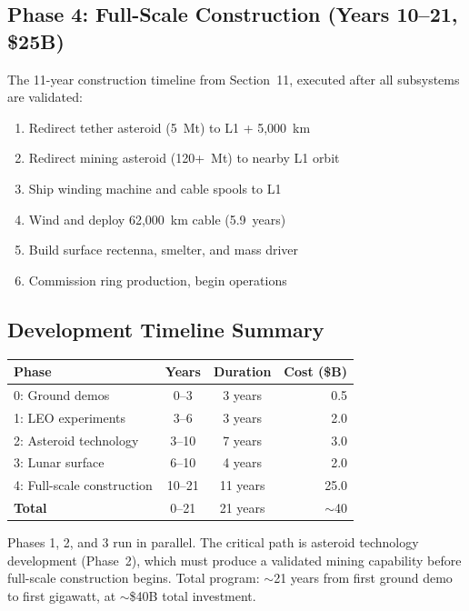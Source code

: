 \documentclass[12pt,letterpaper]{article}
\begin{document}
\subsection{Phase 4: Full-Scale Construction (Years 10--21, \$25B)}

The 11-year construction timeline from Section~11, executed after all subsystems are validated:

\begin{enumerate}[label=(\roman*)]
\item Redirect tether asteroid (5~Mt) to L1 + 5{,}000~km
\item Redirect mining asteroid (120+~Mt) to nearby L1 orbit
\item Ship winding machine and cable spools to L1
\item Wind and deploy 62,000~km cable (5.9~years)
\item Build surface rectenna, smelter, and mass driver
\item Commission ring production, begin operations
\end{enumerate}

\subsection{Development Timeline Summary}

\begin{center}
\small
\begin{tabular}{lccr}
\toprule
\textbf{Phase} & \textbf{Years} & \textbf{Duration} & \textbf{Cost (\$B)} \\
\midrule
0: Ground demos & 0--3 & 3 years & 0.5 \\
1: LEO experiments & 3--6 & 3 years & 2.0 \\
2: Asteroid technology & 3--10 & 7 years & 3.0 \\
3: Lunar surface & 6--10 & 4 years & 2.0 \\
4: Full-scale construction & 10--21 & 11 years & 25.0 \\
\midrule
\textbf{Total} & 0--21 & 21 years & $\sim$40 \\
\bottomrule
\end{tabular}
\end{center}

Phases 1, 2, and 3 run in parallel. The critical path is asteroid technology development (Phase~2), which must produce a validated mining capability before full-scale construction begins. Total program: $\sim$21 years from first ground demo to first gigawatt, at $\sim$\$40B total investment.
\end{document}
